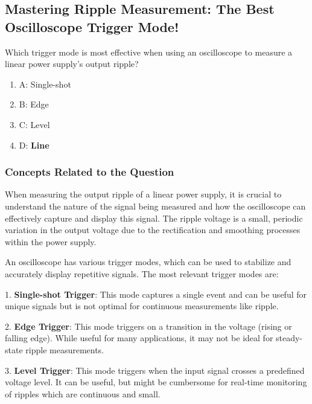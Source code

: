 \subsection{Mastering Ripple Measurement: The Best Oscilloscope Trigger Mode!}

\begin{tcolorbox}[colback=gray!10, colframe=black, title=E4A10] 

Which trigger mode is most effective when using an oscilloscope to measure a linear power supply’s output ripple?

\begin{enumerate}[label=\Alph*),noitemsep]
    \item A: Single-shot
    \item B: Edge
    \item C: Level
    \item D: \textbf{Line}
\end{enumerate} \end{tcolorbox}

\subsubsection{Concepts Related to the Question}

When measuring the output ripple of a linear power supply, it is crucial to understand the nature of the signal being measured and how the oscilloscope can effectively capture and display this signal. The ripple voltage is a small, periodic variation in the output voltage due to the rectification and smoothing processes within the power supply. 

An oscilloscope has various trigger modes, which can be used to stabilize and accurately display repetitive signals. The most relevant trigger modes are:

1. \textbf{Single-shot Trigger}: This mode captures a single event and can be useful for unique signals but is not optimal for continuous measurements like ripple.
   
2. \textbf{Edge Trigger}: This mode triggers on a transition in the voltage (rising or falling edge). While useful for many applications, it may not be ideal for steady-state ripple measurements.

3. \textbf{Level Trigger}: This mode triggers when the input signal crosses a predefined voltage level. It can be useful, but might be cumbersome for real-time monitoring of ripples which are continuous and small.

